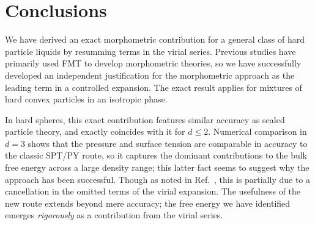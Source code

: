 \documentclass[11pt,twoside]{report}
\begin{document}
\section{Conclusions}

We have derived an exact morphometric contribution for a general class of hard particle liquids by resumming terms in the virial series.
Previous studies have primarily used FMT to develop morphometric theories, so we have successfully developed an independent justification for the morphometric approach as the leading term in a controlled expansion.
The exact result applies for mixtures of hard convex particles in an isotropic phase.


In hard spheres, this exact contribution features similar accuracy as scaled particle theory, and exactly coincides with it for $d \le 2$.
Numerical comparison in $d=3$ shows that the pressure and surface tension are comparable in accuracy to the classic SPT/PY route, so it captures the dominant contributions to the bulk free energy across a large density range; this latter fact seems to suggest why the approach has been successful.
Though as noted in Ref.\ \cite{MarechalPRE2014}, this is partially due to a cancellation in the omitted terms of the virial expansion.
The usefulness of the new route extends beyond mere accuracy; the free energy we have identified emerges \emph{rigorously} as a contribution from the virial series.
\end{document}
